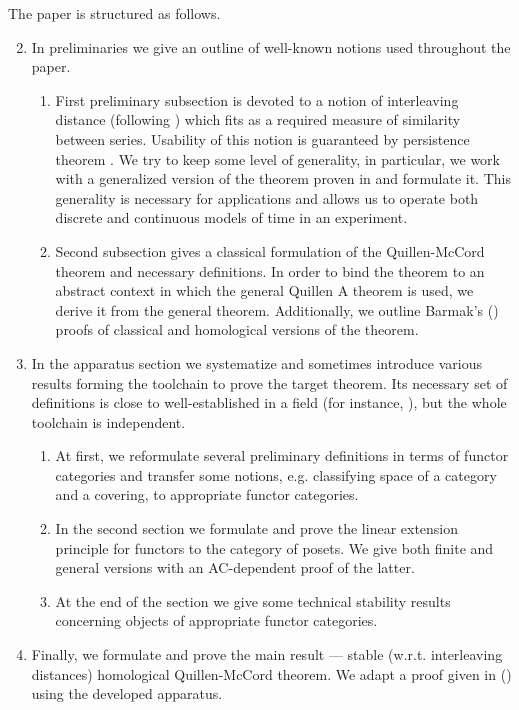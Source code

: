 \documentclass[english,12pt]{article}
\numberwithin{equation}{section}
\theoremstyle{definition}
\theoremstyle{remark}
\begin{document}
The paper is structured as follows.
\begin{enumerate}
  \setcounter{enumi}{1}
  \item In preliminaries we give an outline of well-known notions used throughout the paper.
  \begin{enumerate}[label*=\arabic*.]
    \item First preliminary subsection is devoted to a notion of interleaving distance (following {\cite{GS16}}) which fits as a required measure of similarity between series. Usability of this notion is guaranteed by persistence theorem {\cite{Zomorodian05}}. We try to keep some level of generality, in particular, we work with a generalized version of the theorem proven in {\cite{Corbet18}} and formulate it. This generality is necessary for applications and allows us to operate both discrete and continuous models of time in an experiment.
    \item Second subsection gives a classical formulation of the Quillen-McCord theorem and necessary definitions. In order to bind the theorem to an abstract context in which the general Quillen A theorem {\cite{Quillen72}} is used, we derive it from the general theorem. Additionally, we outline Barmak's ({\cite{Bar11}}) proofs of classical and homological versions of the theorem.
  \end{enumerate}
  \item In the apparatus section we systematize and sometimes introduce various results forming the toolchain to prove the target theorem. Its necessary set of definitions is close to well-established in a field (for instance, {\cite{Bubenik15}}), but the whole toolchain is independent.
  \begin{enumerate}[label*=\arabic*.]
    \item At first, we reformulate several preliminary definitions in terms of functor categories and transfer some notions, e.g. classifying space of a category and a covering, to appropriate functor categories.
    \item In the second section we formulate and prove the linear extension principle for functors to the category of posets. We give both finite and general versions with an AC-dependent proof of the latter.
    \item At the end of the section we give some technical stability results concerning objects of appropriate functor categories.
  \end{enumerate}
  \item Finally, we formulate and prove the main result --- stable (w.r.t. interleaving distances) homological Quillen-McCord theorem. We adapt a proof given in ({\cite{Bar11}}) using the developed apparatus.
\end{enumerate}
\end{document}
